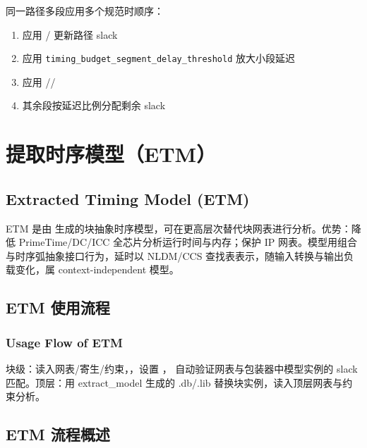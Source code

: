 同一路径多段应用多个规范时顺序：
\begin{enumerate}
  \item 应用 / 更新路径 slack
  \item 应用 \texttt{timing\_budget\_segment\_delay\_threshold} 放大小段延迟
  \item 应用 //
  \item 其余段按延迟比例分配剩余 slack
\end{enumerate}

\section{提取时序模型（ETM）}
\subsection*{Extracted Timing Model (ETM)}

ETM 是由  生成的块抽象时序模型，可在更高层次替代块网表进行分析。优势：降低 PrimeTime/DC/ICC 全芯片分析运行时间与内存；保护 IP 网表。模型用组合与时序弧抽象接口行为，延时以 NLDM/CCS 查找表表示，随输入转换与输出负载变化，属 context-independent 模型。

\subsection{ETM 使用流程}
\subsubsection*{Usage Flow of ETM}

块级：读入网表/寄生/约束，，设置 ， 自动验证网表与包装器中模型实例的 slack 匹配。顶层：用 extract\_model 生成的 .db/.lib 替换块实例，读入顶层网表与约束分析。


\subsection{ETM 流程概述}
